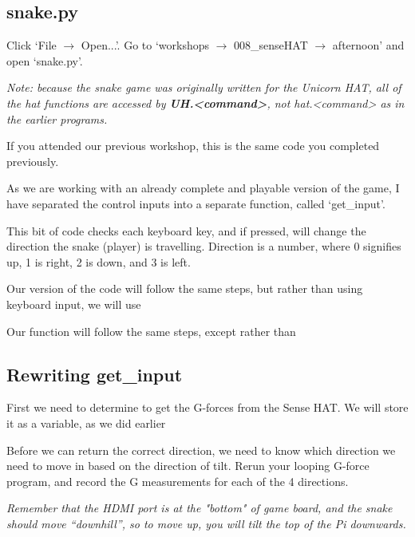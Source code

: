 \documentclass[a4paper, twocolumn, twoside, 12pt]{article}
\begin{document}
	\subsection*{snake.py}
	
		Click `File $\rightarrow$ Open...'.
		Go to `workshops $\rightarrow$ 008\_senseHAT $\rightarrow$ afternoon' and open `snake.py'.
		
		\textit{Note: because the snake game was originally written for the Unicorn HAT, all of the hat functions are accessed by \textbf{UH.<command>}, not hat.<command> as in the earlier programs.}
		
		If you attended our previous workshop, this is the same code you completed previously.
		
		As we are working with an already complete and playable version of the game, I have separated the control inputs into a separate function, called `get\_input'.

		
			
		This bit of code checks each keyboard key, and if pressed, will change the direction the snake (player) is travelling. Direction is a number, where 0 signifies up, 1 is right, 2 is down, and 3 is left.
		
		Our version of the code will follow the same steps, but rather than using keyboard input, we will use
		
		Our function will follow the same steps, except rather than 
		
	\subsection*{Rewriting get\_input}
		
		First we need to determine to get the G-forces from the Sense HAT. We will store it as a variable, as we did earlier
		
		
		
		Before we can return the correct direction, we need to know which direction we need to move in based on the direction of tilt. Rerun your looping G-force program, and record the G measurements for each of the 4 directions.
		
		\textit{\scriptsize Remember that the HDMI port is at the "bottom" of game board, and the snake should move ``downhill'', so to move up, you will tilt the top of the Pi downwards.}
		
\end{document}
